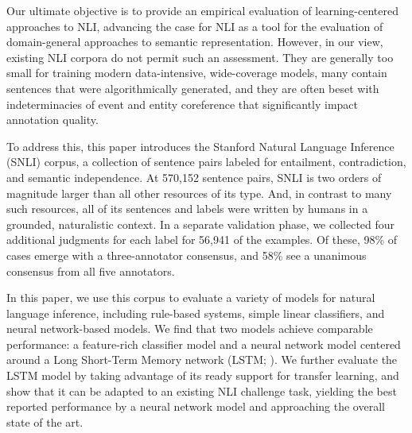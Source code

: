 Our ultimate objective is to provide an empirical
evaluation of learning-centered approaches to NLI,
advancing the case for NLI as a tool for the evaluation of 
domain-general approaches to semantic representation. 
However, in our view, existing NLI corpora do not
permit such an assessment. They are generally too small for training
modern data-intensive, wide-coverage models, many contain sentences
that were algorithmically generated, and they are often beset with
indeterminacies of event and entity coreference that significantly
impact annotation quality.

To address this, this paper introduces the Stanford Natural Language
Inference (SNLI) corpus, a collection of sentence pairs labeled for
entailment, contradiction, and semantic independence. At 570,152
sentence pairs, SNLI is two orders of magnitude larger than all
other resources of its type. And, in contrast to many such resources,
all of its sentences and labels were written by humans in a grounded,
naturalistic context. In a separate validation phase, we collected
four additional judgments for each label for 56,941 of the examples.
Of these, 98\% of cases emerge with a three-annotator consensus, 
and 58\% see a unanimous consensus from all five annotators.

In this paper, we use this corpus to evaluate a variety of models
for natural language inference, including rule-based systems, simple
linear classifiers, and neural network-based models. 
We find that two models achieve comparable performance: a feature-rich
classifier model and a neural network model centered around a Long Short-Term Memory network (LSTM; 
\citealt{hochreiter1997long}). We further evaluate the LSTM model
by taking advantage of its ready support for transfer learning, and show that it can be adapted to an existing
NLI challenge task, yielding the best reported performance by a neural network model and approaching the overall state of the art.





